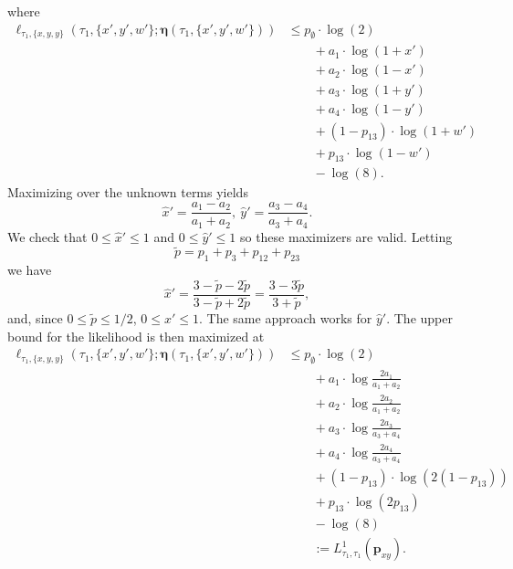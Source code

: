 \documentclass{article}
\newcommand{\fullAncestralSplitPartitions}{\boldsymbol\eta}
\begin{document}
where
\begin{align*}
    \ell_{\tau_1,\{x,y,y\}}(\tau_1, \{x',y',w'\}; \fullAncestralSplitPartitions(\tau_1,\{x',y',w'\}))
    &\le      p_{\emptyset}  \cdot\log(2) \\
    &\qquad + a_{1}\cdot\log(1+x') \\
    &\qquad + a_{2}\cdot\log(1-x') \\
    &\qquad + a_{3}\cdot\log(1+y') \\
    &\qquad + a_{4}\cdot\log(1-y') \\
    &\qquad + (1-p_{13})\cdot\log(1+w') \\
    &\qquad + p_{13}\cdot\log(1-w') \\
    &\qquad - \log(8).
\end{align*}
Maximizing over the unknown terms yields
$$
\hat{x}' = \frac{a_{1}-a_{2}}{a_{1}+a_{2}}, \ \hat{y}' = \frac{a_{3}-a_{4}}{a_{3}+a_{4}}.
$$
We check that $0 \le \hat{x}' \le 1$ and $0 \le \hat{y}' \le 1$ so these maximizers are valid.
Letting
$$
\tilde{p} = p_{1}+p_{3}+p_{12}+p_{23}
$$
we have
$$
\hat{x}' = \frac{3-\tilde{p} - 2\tilde{p}}{3-\tilde{p}+2\tilde{p}} = \frac{3-3\tilde{p}}{3+\tilde{p}},
$$
and, since $0 \le \tilde{p} \le 1/2$, $0 \le \hat{x}' \le 1$.
The same approach works for $\hat{y}'$.
The upper bound for the likelihood is then maximized at
\begin{align*}
    \ell_{\tau_1,\{x,y,y\}}(\tau_1, \{x',y',w'\}; \fullAncestralSplitPartitions(\tau_1,\{x',y',w'\}))
    &\le      p_{\emptyset}  \cdot\log(2) \\
    &\qquad + a_{1}\cdot\log\frac{2a_{1}}{a_{1}+a_{2}} \\
    &\qquad + a_{2}\cdot\log\frac{2a_{2}}{a_{1}+a_{2}} \\
    &\qquad + a_{3}\cdot\log\frac{2a_{3}}{a_{3}+a_{4}} \\
    &\qquad + a_{4}\cdot\log\frac{2a_{4}}{a_{3}+a_{4}} \\
    &\qquad + (1-p_{13})\cdot\log(2(1-p_{13})) \\
    &\qquad + p_{13}\cdot\log(2p_{13}) \\
    &\qquad - \log(8) \\
    &\qquad := L^{1}_{\tau_1,\tau_1}(\mathbf{p}_{xy}).
\end{align*}
\end{document}
